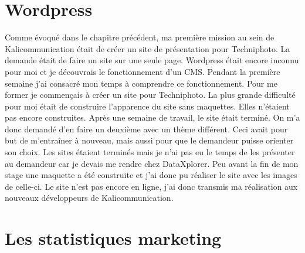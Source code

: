 
\section{Wordpress}
Comme évoqué dans le chapitre précédent, ma première mission au sein de Kalicommunication était de créer un site de présentation pour Techniphoto. La demande était de faire un site sur une seule page. Wordpress était encore inconnu pour moi et je découvrais le fonctionnement d'un CMS. Pendant la première semaine j'ai consacré mon temps à comprendre ce fonctionnement. Pour me former je commençais à créer un site pour Techniphoto. La plus grande difficulté pour moi était de construire l'apparence du site sans maquettes. Elles n'étaient pas encore construites.\newline
Après une semaine de travail, le site était terminé. On m'a donc demandé d'en faire un deuxième avec un thème différent. Ceci avait pour but de m'entraîner à nouveau, mais aussi pour que le demandeur puisse orienter son choix.\newline
Les sites étaient terminés mais je n'ai pas eu le temps de les présenter au demandeur car je devais me rendre chez DataXplorer.
Peu avant la fin de mon stage une maquette a été construite et j'ai donc pu réaliser le site avec les images de celle-ci. Le site n'est pas encore en ligne, j'ai donc transmis ma réalisation aux nouveaux développeurs de Kalicommunication.

\section{Les statistiques marketing}
